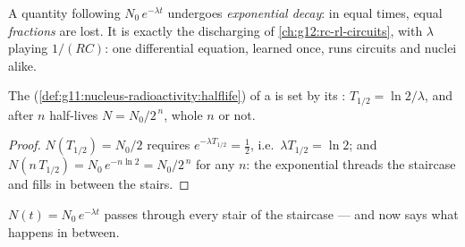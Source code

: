 \begin{definition}\label{def:g12:radioactive-decay:exponential}
A quantity following $N_0\,e^{-\lambda t}$ undergoes \emph{exponential
decay}: in equal times, equal \emph{fractions}
are lost. It is exactly the discharging  of
\cref{ch:g12:rc-rl-circuits}, with $\lambda$ playing $1/(RC)$: one
differential equation, learned once, runs circuits and nuclei alike.
\end{definition}

\begin{proposition}\label{prop:g12:radioactive-decay:halflife}
The  (\cref{def:g11:nucleus-radioactivity:halflife}) of a 
is set by its : $T_{1/2} = \ln 2/\lambda$, and after $n$
half-lives $N = N_0/2^{\,n}$, whole $n$ or not.
\end{proposition}

\begin{proof}
$N(T_{1/2}) = N_0/2$ requires $e^{-\lambda T_{1/2}} = \tfrac12$, i.e.\
$\lambda T_{1/2} = \ln 2$; and $N(n\,T_{1/2}) = N_0\,e^{-n\ln 2} =
N_0/2^{\,n}$ for any $n$: the exponential threads the staircase and fills
in between the stairs.
\end{proof}

\begin{omfigure}

{\small $N(t) = N_0\,e^{-\lambda t}$ passes through every stair of the
staircase --- and now says what happens in between.}
\end{omfigure}

